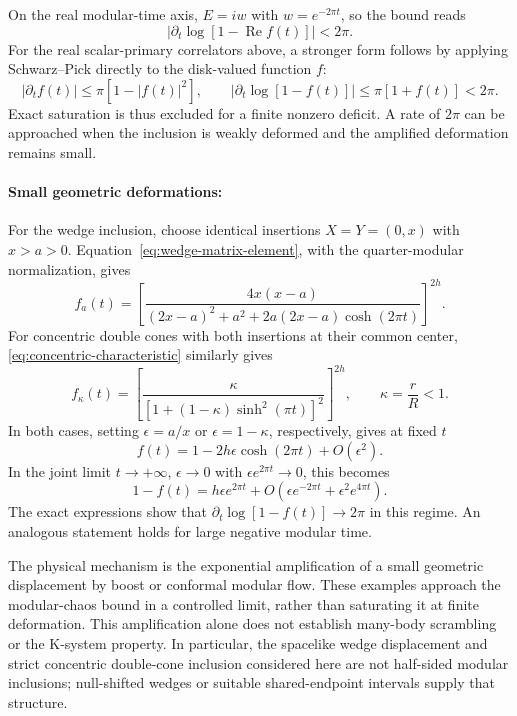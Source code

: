 \documentclass[a4paper,11pt]{article}
\theoremstyle{definition}
\begin{document}
On the real modular-time axis, $E=iw$ with $w=e^{-2\pi t}$, so the bound reads
\[
 \left|\partial_t\log[1-\operatorname{Re}f(t)]\right|<2\pi.
\]
For the real scalar-primary correlators above, a stronger form follows by applying Schwarz--Pick directly to the disk-valued function $f$:
\begin{equation}
 |\partial_t f(t)|\leq\pi[1-|f(t)|^2],\qquad
 \left|\partial_t\log[1-f(t)]\right|\leq\pi[1+f(t)]<2\pi.
 \label{eq:real-axis-modular-chaos-bound}
\end{equation}
Exact saturation is thus excluded for a finite nonzero deficit. A rate of $2\pi$ can be approached when the inclusion is weakly deformed and the amplified deformation remains small.

\paragraph{Small geometric deformations:} For the wedge inclusion, choose identical insertions $X=Y=(0,x)$ with $x>a>0$. Equation~\eqref{eq:wedge-matrix-element}, with the quarter-modular normalization, gives
\begin{equation}
 f_a(t)=\left[
 \frac{4x(x-a)}{(2x-a)^2+a^2+2a(2x-a)\cosh(2\pi t)}
 \right]^{2h}.
 \label{eq:normalized-small-wedge}
\end{equation}
For concentric double cones with both insertions at their common center, \eqref{eq:concentric-characteristic} similarly gives
\begin{equation}
 f_\kappa(t)=\left[
 \frac{\kappa}{[1+(1-\kappa)\sinh^2(\pi t)]^2}
 \right]^{2h},\qquad \kappa=\frac rR<1.
 \label{eq:normalized-small-cones}
\end{equation}
In both cases, setting $\epsilon=a/x$ or $\epsilon=1-\kappa$, respectively, gives at fixed $t$
\begin{equation}
 f(t)=1-2h\epsilon\cosh(2\pi t)+O(\epsilon^2).
 \label{eq:small-deformation-expansion}
\end{equation}
In the joint limit $t\to+\infty$, $\epsilon\to0$ with $\epsilon e^{2\pi t}\to0$, this becomes
\begin{equation}
 1-f(t)=h\epsilon e^{2\pi t}
 +O\!\left(\epsilon e^{-2\pi t}+\epsilon^2e^{4\pi t}\right).
 \label{eq:asymptotic-saturation}
\end{equation}
The exact expressions show that $\partial_t\log[1-f(t)]\to2\pi$ in this regime. An analogous statement holds for large negative modular time.

The physical mechanism is the exponential amplification of a small geometric displacement by boost or conformal modular flow. These examples approach the modular-chaos bound in a controlled limit, rather than saturating it at finite deformation. This amplification alone does not establish many-body scrambling or the K-system property. In particular, the spacelike wedge displacement and strict concentric double-cone inclusion considered here are not half-sided modular inclusions; null-shifted wedges or suitable shared-endpoint intervals supply that structure.
\end{document}
